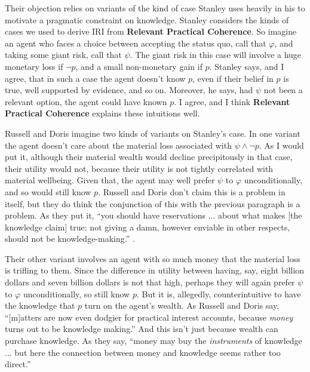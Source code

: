 \documentclass[oneside]{book}
\begin{document}
Their objection relies on variants of the kind of case Stanley uses heavily in his \citeyearpar{Stanley2005-STAKAP} to motivate a pragmatic constraint on knowledge. Stanley considers the kinds of cases we used to derive IRI from \textbf{Relevant Practical Coherence}. So imagine an agent who faces a choice between accepting the status quo, call that $\varphi$, and taking some giant risk, call that $\psi$. The giant risk in this case will involve a huge monetary loss if $\neg p$, and a small non-monetary gain if $p$. Stanley says, and I agree, that in such a case the agent doesn't know $p$, even if their belief in $p$ is true, well supported by evidence, and so on. Moreover, he says, had $\psi$ not been a relevant option, the agent could have known $p$. I agree, and I think \textbf{Relevant Practical Coherence} explains these intuitions well.

Russell and Doris imagine two kinds of variants on Stanley's case. In one variant the agent doesn't care about the material loss associated with $\psi \wedge \neg p$. As I would put it, although their material wealth would decline precipitously in that case, their utility would not, because their utility is not tightly correlated with material wellbeing. Given that, the agent may well prefer $\psi$ to $\varphi$ unconditionally, and so would still know $p$. Russell and Doris don't claim this is a problem in itself, but they do think the conjunction of this with the previous paragraph is a problem. As they put it, ``you should have reservations ... about what makes [the knowledge claim] true: not giving a damn, however enviable in other respects, should not be knowledge-making.'' \citep[432]{RussellDoris2008}. 

Their other variant involves an agent with so much money that the material loss is trifling to them. Since the difference in utility between having, say, eight billion dollars and seven billion dollars is not that high, perhaps they will again prefer $\psi$ to $\varphi$ unconditionally, so still know $p$. But it is, allegedly, counterintuitive to have the knowledge that $p$ turn on the agent's wealth. As Russell and Doris say, ``[m]atters are now even dodgier for practical interest accounts, because \textit{money} turns out to be knowledge making.'' \citep[433]{RussellDoris2008} And this isn't just because wealth can purchase knowledge. As they say, ``money may buy the \textit{instruments} of knowledge ... but here the connection between money and knowledge seems rather too direct.'' \citep[433]{RussellDoris2008}
\end{document}
